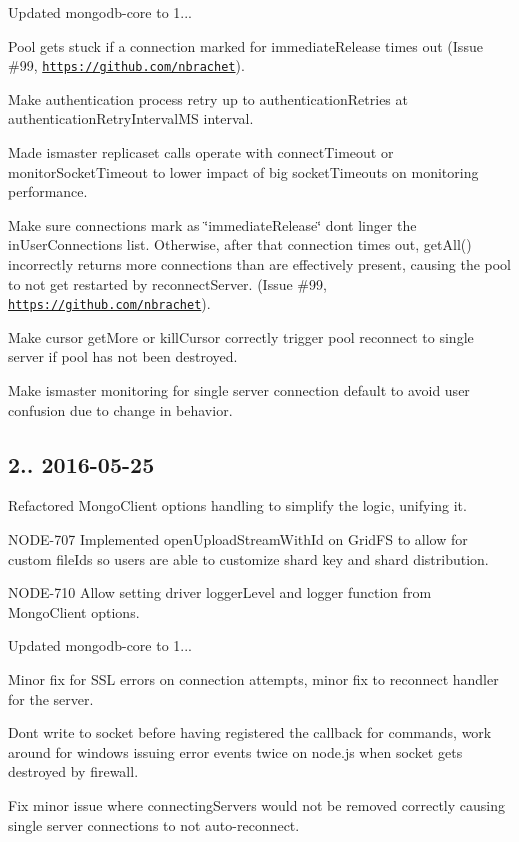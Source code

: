 \begin{DoxyItemize}
\item Updated mongodb-\/core to 1...
\item Pool gets stuck if a connection marked for immediate\+Release times out (Issue \#99, \href{https://github.com/nbrachet}{\tt https\+://github.\+com/nbrachet}).
\item Make authentication process retry up to authentication\+Retries at authentication\+Retry\+Interval\+MS interval.
\item Made ismaster replicaset calls operate with connect\+Timeout or monitor\+Socket\+Timeout to lower impact of big socket\+Timeouts on monitoring performance.
\item Make sure connections mark as \char`\"{}immediate\+Release\char`\"{} don\textquotesingle{}t linger the in\+User\+Connections list. Otherwise, after that connection times out, get\+All() incorrectly returns more connections than are effectively present, causing the pool to not get restarted by reconnect\+Server. (Issue \#99, \href{https://github.com/nbrachet}{\tt https\+://github.\+com/nbrachet}).
\item Make cursor get\+More or kill\+Cursor correctly trigger pool reconnect to single server if pool has not been destroyed.
\item Make ismaster monitoring for single server connection default to avoid user confusion due to change in behavior.
\end{DoxyItemize}

\subsection*{2.. 2016-\/05-\/25 }


\begin{DoxyItemize}
\item Refactored Mongo\+Client options handling to simplify the logic, unifying it.
\item N\+O\+D\+E-\/707 Implemented open\+Upload\+Stream\+With\+Id on Grid\+FS to allow for custom file\+Ids so users are able to customize shard key and shard distribution.
\item N\+O\+D\+E-\/710 Allow setting driver logger\+Level and logger function from Mongo\+Client options.
\item Updated mongodb-\/core to 1...
\item Minor fix for S\+SL errors on connection attempts, minor fix to reconnect handler for the server.
\item Don\textquotesingle{}t write to socket before having registered the callback for commands, work around for windows issuing error events twice on node.\+js when socket gets destroyed by firewall.
\item Fix minor issue where connecting\+Servers would not be removed correctly causing single server connections to not auto-\/reconnect.
\end{DoxyItemize}

